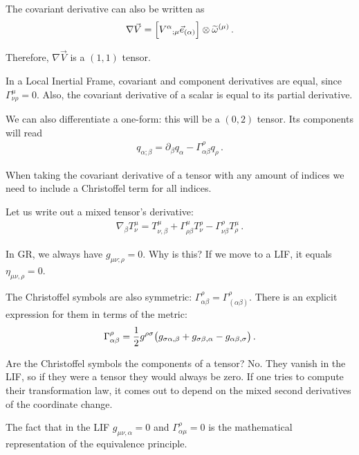\documentclass[main.tex]{subfiles}
\begin{document}
The  covariant derivative can also be written as 
%
\begin{align}
\nabla \vec{V} = \qty[V^{\alpha }{}_{; \mu } \vec{e}_{(\alpha )}] \otimes \widetilde{\omega}^{(\mu )}
\,.
\end{align}

Therefore, \(\nabla \vec{V}\) is a \((1, 1)\) tensor. 

In a Local Inertial Frame, covariant and component derivatives are equal, since \(\Gamma^{\mu }_{\nu \rho } = 0\). 
Also, the covariant derivative of a scalar is equal to its 
partial derivative. 

We can also differentiate a one-form: this will be a \((0, 2)\) tensor. Its components will read 
%
\begin{align}
q_{\alpha ; \beta } = \partial_\beta q_\alpha - \Gamma^{\rho }_{\alpha \beta } q_\rho
\,.
\end{align}

When taking the covariant derivative of a tensor with any amount of indices we need to include a Christoffel term for all indices. 

Let us write out a mixed tensor's derivative:
%
\begin{align}
\nabla_\beta T^{\mu }_\nu = T^{\mu }_{\nu , \beta } 
+ \Gamma^{\mu }_{\rho \beta }T^{\rho }_\nu  
- \Gamma^{\rho }_{\nu  \beta }T^{\mu }_\rho   
\,.
\end{align}

In GR, we always have \(g_{\mu \nu ; \rho } = 0\). 
Why is this? If we move to a LIF, it equals \(\eta_{\mu \nu , \rho } = 0\).

The Christoffel symbols are also symmetric: \(\Gamma^{\rho }_{\alpha \beta } = \Gamma^{\rho }_{(\alpha \beta )}\). 
There is an explicit expression for them in terms of the metric: 
%
\begin{align}
\Gamma^{\rho }_{\alpha \beta } = \frac{1}{2} g^{\rho \sigma } \qty(g_{\sigma \alpha , \beta } + g_{\sigma \beta , \alpha } - g_{\alpha \beta , \sigma })
\,.
\end{align}

Are the Christoffel symbols the components of a tensor? No. 
They vanish in the LIF, so if they were a tensor they would always be zero. 
If one tries to compute their transformation law, it comes out to depend on the mixed second derivatives of the coordinate change. 

The fact that in the LIF \(g_{\mu \nu , \alpha } = 0 \) and \(\Gamma^{\rho }_{\alpha \mu } = 0\) is the mathematical representation of the equivalence principle. 
\end{document}
